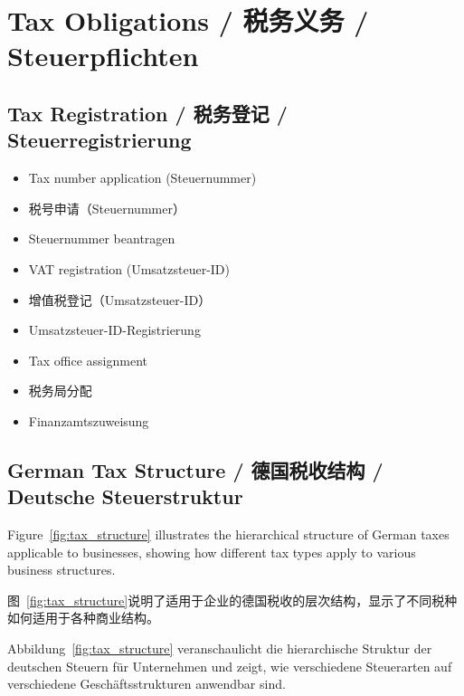 \section{Tax Obligations / 税务义务 / Steuerpflichten}

\subsection{Tax Registration / 税务登记 / Steuerregistrierung}
\begin{itemize}
    \item Tax number application (Steuernummer)
    \item 税号申请（Steuernummer）
    \item Steuernummer beantragen
    \item VAT registration (Umsatzsteuer-ID)
    \item 增值税登记（Umsatzsteuer-ID）
    \item Umsatzsteuer-ID-Registrierung
    \item Tax office assignment
    \item 税务局分配
    \item Finanzamtszuweisung
\end{itemize}

\subsection{German Tax Structure / 德国税收结构 / Deutsche Steuerstruktur}

Figure~\ref{fig:tax_structure} illustrates the hierarchical structure of German taxes applicable to businesses, showing how different tax types apply to various business structures.

图~\ref{fig:tax_structure}说明了适用于企业的德国税收的层次结构，显示了不同税种如何适用于各种商业结构。

Abbildung~\ref{fig:tax_structure} veranschaulicht die hierarchische Struktur der deutschen Steuern für Unternehmen und zeigt, wie verschiedene Steuerarten auf verschiedene Geschäftsstrukturen anwendbar sind.

